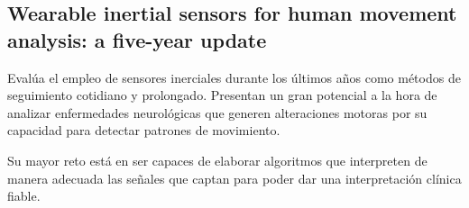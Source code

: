 \subsection{Wearable inertial sensors for human movement analysis: a five-year update}

Evalúa el empleo de sensores inerciales durante los últimos años como métodos de seguimiento cotidiano y prolongado. Presentan un gran potencial a la hora de analizar enfermedades neurológicas que generen alteraciones motoras por su capacidad para detectar patrones de movimiento. 

Su mayor reto está en ser capaces de elaborar algoritmos que interpreten de manera adecuada las señales que captan para poder dar una interpretación clínica fiable. \cite{Picerno2021}
